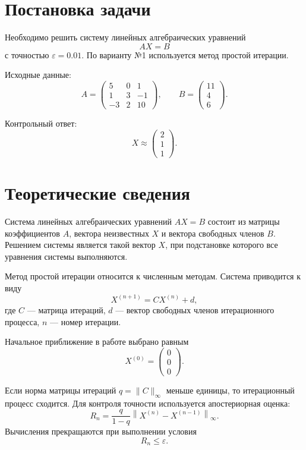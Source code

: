 \documentclass[12pt,a4paper]{article}
\begin{document}
\tableofcontents
\newpage

\section{Постановка задачи}

Необходимо решить систему линейных алгебраических уравнений
\[
AX = B
\]
с точностью \(\varepsilon = 0.01\). По варианту №1 используется метод простой итерации.

Исходные данные:
\[
A =
\begin{pmatrix}
5 & 0 & 1\\
1 & 3 & -1\\
-3 & 2 & 10
\end{pmatrix},
\qquad
B =
\begin{pmatrix}
11\\
4\\
6
\end{pmatrix}.
\]

Контрольный ответ:
\[
X \approx
\begin{pmatrix}
2\\
1\\
1
\end{pmatrix}.
\]

\section{Теоретические сведения}

Система линейных алгебраических уравнений \(AX=B\) состоит из матрицы коэффициентов \(A\), вектора неизвестных \(X\) и вектора свободных членов \(B\). Решением системы является такой вектор \(X\), при подстановке которого все уравнения системы выполняются.

Метод простой итерации относится к численным методам. Система приводится к виду
\[
X^{(n+1)} = C X^{(n)} + d,
\]
где \(C\) --- матрица итераций, \(d\) --- вектор свободных членов итерационного процесса, \(n\) --- номер итерации.

Начальное приближение в работе выбрано равным
\[
X^{(0)} =
\begin{pmatrix}
0\\
0\\
0
\end{pmatrix}.
\]

Если норма матрицы итераций \(q=\|C\|_{\infty}\) меньше единицы, то итерационный процесс сходится. Для контроля точности используется апостериорная оценка:
\[
R_n = \frac{q}{1-q}\left\|X^{(n)}-X^{(n-1)}\right\|_{\infty}.
\]
Вычисления прекращаются при выполнении условия
\[
R_n \leq \varepsilon.
\]
\end{document}
